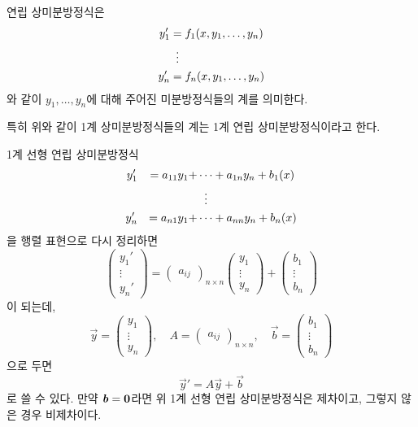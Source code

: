 \documentclass[../engineering_mathematics_lecture_note.tex]{subfiles}
\begin{document}
\begin{definition}
    연립 상미분방정식은
    \begin{align*}
        y_1' &= f_1 (x, y_1, \dots, y_n)\\
             &\vdotswithin{=}\\
        y_n' &= f_n (x, y_1, \dots, y_n)
    \end{align*}
    와 같이 $y_1, \dots, y_n$에 대해 주어진 미분방정식들의 계를 의미한다.
    
    특히 위와 같이 1계 상미분방정식들의 계는 1계 연립 상미분방정식이라고 한다.
\end{definition}

\begin{example}
    1계 선형 연립 상미분방정식
    \begin{alignat*}{2}
        y_1' &&= a_{11} y_1 + &\dots + a_{1n} y_n + b_1(x)\\
             &&&\vdotswithin{\dots}\\
        y_n' &&= a_{n1} y_1 + &\dots + a_{nn} y_n + b_n(x)
    \end{alignat*}
    을 행렬 표현으로 다시 정리하면
    \begin{equation*}
        \begin{pmatrix}
            y_1' \\ \vdots \\ y_n'
        \end{pmatrix}
        = \begin{pmatrix}
            a_{ij}
        \end{pmatrix}_{n \times n}
        \begin{pmatrix}
            y_1 \\ \vdots \\ y_n
        \end{pmatrix}
        + \begin{pmatrix}
            b_1 \\ \vdots \\ b_n
        \end{pmatrix}
    \end{equation*}
    이 되는데,
    \begin{equation*}
        \vec y =
        \begin{pmatrix}
            y_1 \\ \vdots \\ y_n
        \end{pmatrix}, \quad
        A = \begin{pmatrix}
            a_{ij}
        \end{pmatrix}_{n \times n}, \quad
        \vec b =
        \begin{pmatrix}
            b_1 \\ \vdots \\ b_n
        \end{pmatrix}
    \end{equation*}
    으로 두면
    \begin{equation*}
        \vec y' = A \vec y + \vec b
    \end{equation*}
    로 쓸 수 있다.
    만약 $\bm{\mathit{b}} = \bm{\mathrm{0}}$라면 위 1계 선형 연립 상미분방정식은 제차이고, 그렇지 않은 경우 비제차이다.
\end{example}
\end{document}
